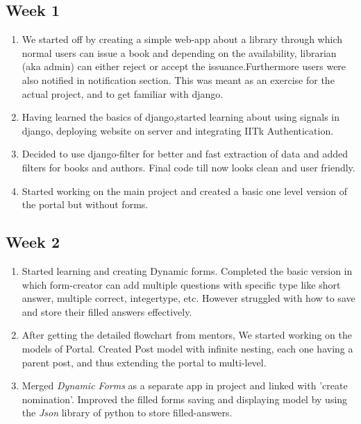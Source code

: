 \documentclass[12pt,a4paper]{scrartcl}
\begin{document}
\subsection{Week 1}
\begin{enumerate}
	\item We started off by creating a simple web-app about a library through which normal users can issue a book and depending on the availability, librarian (aka admin) can either reject or accept the issuance.Furthermore users were also notified in notification section. This was meant as an exercise for the actual project, and to get familiar with django.
	\item Having learned the basics of django,started learning about using signals in django, deploying website on server and integrating IITk Authentication.
	\item Decided to use django-filter for better and fast extraction of data and added filters for books and authors. Final code till now looks clean and user friendly.
	\item Started working on the main project and created a basic one level version of the portal but without forms.
\end{enumerate}

\subsection{Week 2}
\begin{enumerate}
	\item Started learning and creating Dynamic forms. Completed the basic version in which form-creator can add multiple questions with specific type like short answer, multiple correct, integertype, etc. However struggled with how to save and store their filled answers effectively.
	\item After getting the detailed flowchart from mentors, We started working on the models of Portal. Created Post model with infinite nesting, each one having a parent post, and thus extending the portal to multi-level.
	\item Merged \textit{Dynamic Forms} as a separate app in project and linked with 'create nomination'. Improved the filled forms saving and displaying model by  using the \textit{Json} library of python to store filled-answers.
\end{enumerate}
\end{document}
